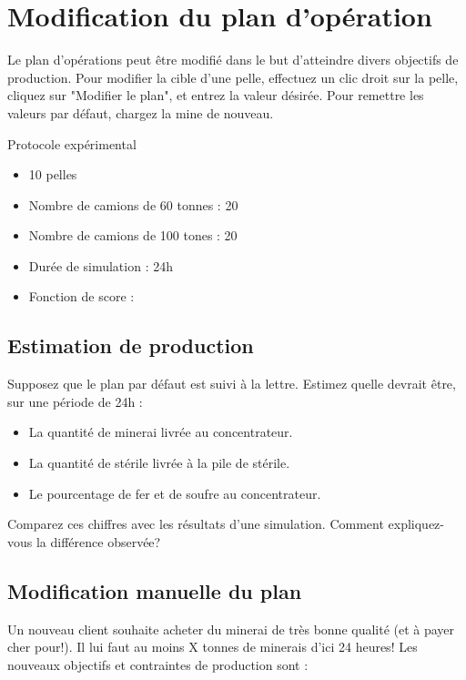 \section{Modification du plan d'opération}

Le plan d'opérations peut être modifié dans le but d'atteindre divers objectifs de production. Pour modifier la cible d'une pelle, effectuez un clic droit sur la pelle, cliquez sur "Modifier le plan", et entrez la valeur désirée. Pour remettre les valeurs par défaut, chargez la mine de nouveau.

Protocole expérimental 

\begin{itemize}
	\item 10 pelles
	\item Nombre de camions de 60 tonnes : 20
	\item Nombre de camions de 100 tones : 20
	\item Durée de simulation : 24h
	\item Fonction de score : 
\end{itemize}


\subsection{Estimation de production}

Supposez que le plan par défaut est suivi à la lettre. Estimez quelle devrait être, sur une période de 24h : 

\begin{itemize}
	\item La quantité de minerai livrée au concentrateur.
	\item La quantité de stérile livrée à la pile de stérile.
	\item Le pourcentage de fer et de soufre au concentrateur.
\end{itemize}

Comparez ces chiffres avec les résultats d'une simulation. Comment expliquez-vous la différence observée?

\subsection{Modification manuelle du plan}

Un nouveau client souhaite acheter du minerai de très bonne qualité (et à payer cher pour!). Il lui faut au moins X tonnes de minerais d'ici 24 heures! Les nouveaux objectifs et contraintes de production sont : 


